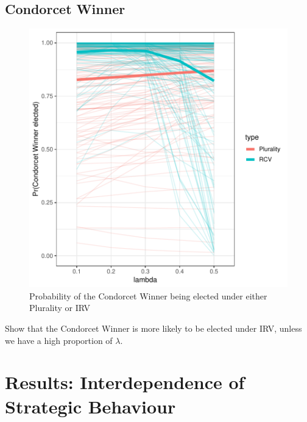 \documentclass[11pt, letter]{article}
\begin{document}
\subsection{Condorcet Winner}

\begin{figure}[!h]
	\centering
	\includegraphics[width = .8 \textwidth]{"../output/figures/condorcet_probs"}
	\caption{Probability of the Condorcet Winner being elected under either Plurality or IRV}
	\label{fig:sv_condor}
\end{figure}

Show that the Condorcet Winner is more likely to be elected under IRV, unless we have a high proportion of $\lambda$.


\section{Results: Interdependence of Strategic Behaviour}
\end{document}
